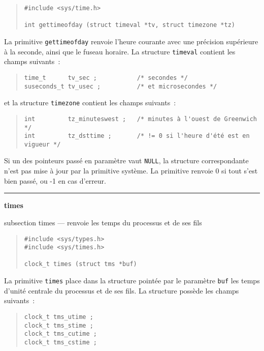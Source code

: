 \documentclass [twoside] {report}
\newcommand {\primitive} [1]
    {
	{\large \bf #1}
	\addcontentsline {toc} {subsection} {#1}
    }
\newcommand {\separation}
    {
	\vspace {7mm}
	\nopagebreak
	\hrule
    }
\begin{document}
\begin {quote}
\begin {verbatim}
#include <sys/time.h>

int gettimeofday (struct timeval *tv, struct timezone *tz)
\end{verbatim}
\end {quote}


La primitive \texttt {gettimeofday} renvoie l'heure courante avec une
précision supérieure à la seconde, ainsi que le fuseau horaire. La
structure \texttt {timeval} contient les champs suivants~:
\begin {quote}
\begin {verbatim}
time_t      tv_sec ;           /* secondes */
suseconds_t tv_usec ;          /* et microsecondes */
\end{verbatim}
\end {quote}
et la structure \texttt {timezone} contient les champs suivants~:
\begin {quote}
\begin {verbatim}
int         tz_minuteswest ;   /* minutes à l'ouest de Greenwich */
int         tz_dsttime ;       /* != 0 si l'heure d'été est en vigueur */
\end{verbatim}
\end {quote}

Si un des pointeurs passé en paramètre vaut \texttt {NULL}, la structure
correspondante n'est pas mise à jour par la primitive système. La
primitive renvoie 0 si tout s'est bien passé, ou -1 en cas d'erreur.


\separation
\primitive {times} --- renvoie les temps du processus et de ses fils

\begin {quote}
\begin {verbatim}
#include <sys/types.h>
#include <sys/times.h>

clock_t times (struct tms *buf)
\end{verbatim}
\end {quote}

La primitive {\tt times} place dans la structure pointée par le
paramètre \texttt {buf} les temps d'unité centrale du processus et de
ses fils. La structure possède les champs suivants~:

\begin {quote}
\begin {verbatim}
clock_t tms_utime ;
clock_t tms_stime ;
clock_t tms_cutime ;
clock_t tms_cstime ;
\end{verbatim}
\end {quote}
\end{document}
